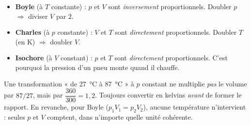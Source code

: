 \documentclass[11pt,a4paper]{article}
\begin{document}
\begin{exemplebox}
\begin{itemize}[leftmargin=1.4em,topsep=2pt,itemsep=2pt]
  \item \textbf{Boyle} (à $T$ constante) : $p$ et $V$ sont \emph{inversement} proportionnels. Doubler
        $p$ $\Rightarrow$ diviser $V$ par $2$.
  \item \textbf{Charles} (à $p$ constante) : $V$ et $T$ sont \emph{directement} proportionnels. Doubler
        $T$ (en \si{\kelvin}) $\Rightarrow$ doubler $V$.
  \item \textbf{Isochore} (à $V$ constant) : $p$ et $T$ sont \emph{directement} proportionnels. C'est
        pourquoi la pression d'un pneu monte quand il chauffe.
\end{itemize}
\end{exemplebox}

\begin{piege}
Une transformation « de \qty{27}{\degreeCelsius} à \qty{87}{\degreeCelsius} » à $p$ constant ne
multiplie \emph{pas} le volume par $87/27$, mais par $\dfrac{360}{300}=1{,}2$. Toujours convertir en
kelvins \emph{avant} de former le rapport. En revanche, pour Boyle ($p_1V_1=p_2V_2$), aucune
température n'intervient : seules $p$ et $V$ comptent, dans n'importe quelle unité cohérente.
\end{piege}
\end{document}
